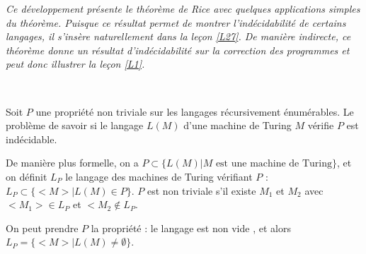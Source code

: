 

\textit{Ce développement présente le théorème de Rice avec quelques applications simples du théorème. Puisque ce résultat permet de montrer l'indécidabilité de certains langages, il s'insère naturellement dans la leçon \ref{L27}. De manière indirecte, ce théorème donne un résultat d'indécidabilité sur la correction des programmes et peut donc illustrer la leçon \ref{L1}.}

\begin{theorem}~

Soit $P$ une propriété non triviale sur les langages récursivement énumérables. Le problème de savoir si le langage $L(M)$ d'une machine de Turing $M$ vérifie $P$ est indécidable.
\end{theorem}

De manière plus formelle, on a $P\subset \{ L(M) | M \text{ est une machine de Turing}\}$, et on définit $L_P$ le langage des machines de Turing vérifiant $P$ : $L_P \subset \{<M> | L(M) \in P\}$. $P$ est non triviale s'il existe $M_1$ et $M_2$ avec $<M_1>\in L_P$ et $<M_2 \notin L_P$.

\begin{example}
On peut prendre $P$ la propriété : \og le langage est non vide \fg{}, et alors $L_P =\{<M> | L(M)\neq \emptyset \}$.
\end{example}

